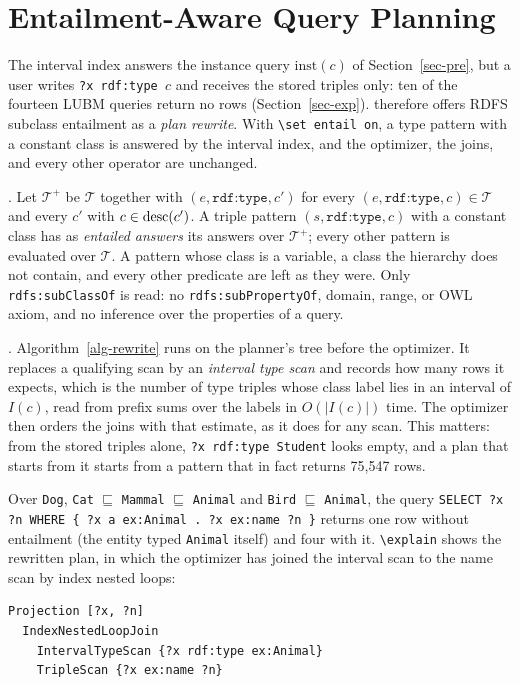 \section{Entailment-Aware Query Planning}
\label{sec-rewrite}

The interval index answers the instance query $\mathrm{inst}(c)$ of
Section~\ref{sec-pre}, but a \sparql user writes \texttt{?x rdf:type $c$} and
receives the stored triples only: ten of the fourteen LUBM queries return no
rows (Section~\ref{sec-exp}).
\sys therefore offers RDFS subclass entailment as a \emph{plan rewrite}.
With \texttt{\textbackslash set entail on}, a type pattern with a constant
class is answered by the interval index, and the optimizer, the joins, and
every other operator are unchanged.

.
Let $\mathcal{T}^{+}$ be $\mathcal{T}$ together with $(e,\texttt{rdf:type},c')$ for
every $(e,\texttt{rdf:type},c)\in\mathcal{T}$ and every $c'$ with $c\in\mathrm{desc}(c')$.
A triple pattern $(s,\texttt{rdf:type},c)$ with a constant class has as
\emph{entailed answers} its answers over $\mathcal{T}^{+}$; every other pattern
is evaluated over $\mathcal{T}$.
A pattern whose class is a variable, a class the hierarchy does not contain,
and every other predicate are left as they were.
Only \texttt{rdfs:subClassOf} is read: no \texttt{rdfs:subPropertyOf}, domain,
range, or OWL axiom, and no inference over the properties of a query.

.
Algorithm~\ref{alg-rewrite} runs on the planner's tree before the optimizer.
It replaces a qualifying scan by an \emph{interval type scan} and records how
many rows it expects, which is the number of type triples whose class label
lies in an interval of $I(c)$, read from prefix sums over the labels in
$O(|I(c)|)$ time.
The optimizer then orders the joins with that estimate, as it does for any
scan.
This matters: from the stored triples alone, \texttt{?x rdf:type Student}
looks empty, and a plan that starts from it starts from a pattern that in fact
returns 75,547 rows.

\begin{example}
Over \texttt{Dog}, \texttt{Cat} $\sqsubseteq$ \texttt{Mammal} $\sqsubseteq$ \texttt{Animal}
and \texttt{Bird} $\sqsubseteq$ \texttt{Animal}, the query
\texttt{SELECT ?x ?n WHERE \{ ?x a ex:Animal . ?x ex:name ?n \}} returns one row
without entailment (the entity typed \texttt{Animal} itself) and four with it.
\texttt{\textbackslash explain} shows the rewritten plan, in which the optimizer
has joined the interval scan to the name scan by index nested loops:
\begin{small}\begin{verbatim}
Projection [?x, ?n]
  IndexNestedLoopJoin
    IntervalTypeScan {?x rdf:type ex:Animal}
    TripleScan {?x ex:name ?n}
\end{verbatim}\end{small}
\end{example}


